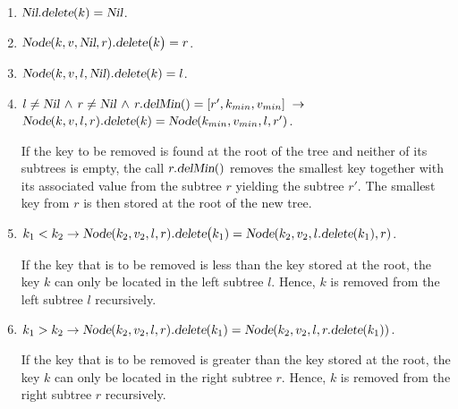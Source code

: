 \begin{enumerate}
\item $\textsl{Nil}.\textsl{delete}(k) = \textsl{Nil}$.
\item $\textsl{Node}(k,v,\textsl{Nil},r).\textsl{delete}\bigl(k\bigr) = r$.
\item $\textsl{Node}(k,v,l,\textsl{Nil}).\textsl{delete}(k) = l$.
\item $l \not= \textsl{Nil} \,\wedge\, r \not= \textsl{Nil} \,\wedge\, r.\textsl{delMin}() = [r',k_{min}, v_{min}]  \;\rightarrow$ \\[0.2cm]
      \hspace*{1.3cm}
      $\textsl{Node}(k,v,l,r).\textsl{delete}(k) = \textsl{Node}(k_{min},v_{min},l,r')$.
      
      If the key to be removed is found at the root of the tree and neither of its subtrees is
      empty, the call  $r\mathtt{.}\textsl{delMin}()$ removes the smallest key together with its
      associated value from the subtree $r$ yielding the subtree $r'$.
      The smallest key from $r$ is then stored at the root of the new tree.

\item $k_1 < k_2 \rightarrow \textsl{Node}(k_2,v_2,l,r).\textsl{delete}\bigl(k_1) = 
       \textsl{Node}(k_2,v_2,l.\textsl{delete}(k_1),r)$.

       If the key that is to be removed is less than the key stored at the root, the key $k$ can only be
       located in the left subtree $l$.  Hence, $k$ is removed from the left subtree $l$ recursively.
\item $k_1 > k_2 \rightarrow \textsl{Node}(k_2,v_2,l,r).\textsl{delete}(k_1) = 
       \textsl{Node}(k_2,v_2,l,r.\textsl{delete}(k_1))$.

       If the key that is to be removed is greater than the key stored at the root, the key $k$ can only be
       located in the right subtree $r$.  Hence, $k$ is removed from the right subtree $r$ recursively.
\end{enumerate}


